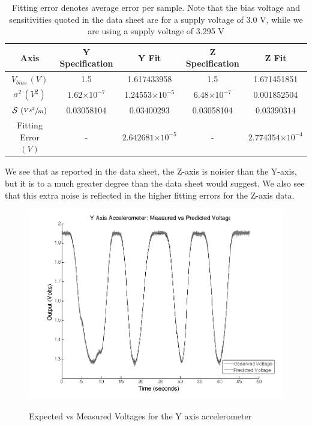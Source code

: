 \documentclass{article}
\theoremstyle{plain}
\theoremstyle{definition}
\theoremstyle{remark}
\newcommand{\Sens}{\mathcal{S}}
\providecommand{\e}[1]{\ensuremath{\times 10^{#1}}}
\begin{document}
\begin{table}
\begin{center}
    \begin{tabular}{|c|c|c|c|c|}
        \hline
        Axis                              & Y Specification & Y   Fit & Z Specification                & Z    Fit                \\ \hline
        $V_{bias} \, (V)$                & 1.5        & 1.617433958  & 1.5         & 1.671451851           \\ 
        $\sigma^2 \, (V^2)$                  & $1.62 \e{-7}$      & 1.24553\e{-5}    & $6.48 \e{-7}$       & 0.001852504           \\ 
        $\Sens \, \left(\sfrac{V s^2}{m} \right)$                & 0.03058104           & $0.03400293$  & 0.03058104   & $0.03390314$     \\ 
        Fitting Error $(V)$  & - & $2.642681\e{-5}$  & - & $2.774354\e{-4}$ \\
        \hline
    \end{tabular}
\label{ParamID_T}
\caption{Fitting error denotes average error per sample.  Note that the bias voltage and sensitivities quoted in the data sheet are for a supply voltage of 3.0 V, while we are using a supply voltage of 3.295 V}
\end{center}
\end{table}

We see that as reported in the data sheet, the Z-axis is noisier than the Y-axis, but it is to a much greater degree than the data sheet would suggest.  We also see that this extra noise is reflected in the higher fitting errors for the Z-axis data.  

\begin{figure}
\begin{center}
\includegraphics[width = 13cm]{YaxisAccel_Calib.png}
\label{YaccelCalib}
\caption{Expected vs Measured Voltages for the Y axis accelerometer}
\end{center}
\end{figure}
\end{document}
